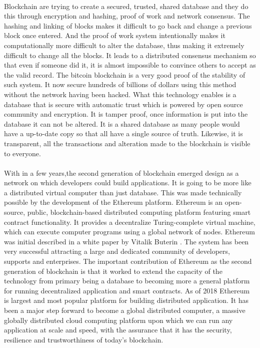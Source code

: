 \documentclass [12pt]{report}
\begin{document}
\paragraph{}Blockchain are trying to create a secured, trusted, 
shared database and they do this through encryption and hashing,
proof of work and network consensus. The hashing and linking of blocks 
makes it difficult to go back and change a previous block once entered. 
And the proof of work system intentionally makes it computationally more difficult to alter the database,
thus making it extremely difficult to change all the blocks. It leads to a distributed consensus mechanism so that even if someone did it,
it is almost impossible to convince others to accept as the valid record. The bitcoin blockchain is a very good proof of the stability of such system.
It now secure hundreds of billions of dollars using this method without the network having been hacked. 
What this technology enables is a database that is secure with automatic trust 
which is powered by open source community and encryption.
It is tamper proof, once information is put into the database it can not be altered. 
It is a shared database as many people would have a up-to-date copy so that all have a single source of truth.
Likewise, it is transparent, all the transactions and alteration made to the blockchain is visible to everyone.
\paragraph{}With in a few years,the second generation of blockchain emerged design as a network on which developers could build applications. 
It is going to be more like a distributed virtual computer than just database.
This was made technically possible by the development of the Ethereum platform. 
Ethereum is an open-source, public, blockchain-based distributed computing platform featuring smart contract functionality.
It provides a decentralize Turing-complete virtual machine, which can execute computer programs using a global network of nodes.
Ethereum was initial described in a white paper by Vitalik Buterin \cite{buterin2013ethereum}. 
The system has been very successful attracting a large and dedicated community of developers, supports and enterprises.
The important contribution of Ethereum as the second generation of blockchain is that 
it worked to extend the capacity of the technology from primary
being a database to becoming more a general platform for running decentralized application and smart contracts.
As of 2018 Ethereum is largest and most popular platform for building distributed application. 
It has been a major step forward to become a global distributed computer, 
a massive globally distributed cloud computing platform upon which we can run any application at scale and speed,
with the assurance that it has the security, resilience and trustworthiness of today's blockchain.
\end{document}
